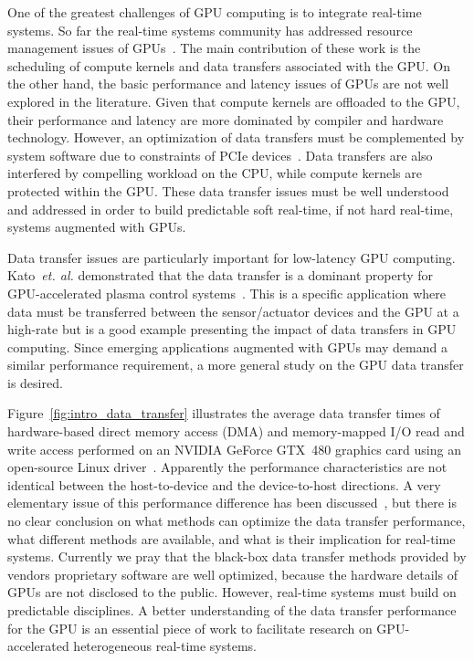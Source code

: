 One of the greatest challenges of GPU computing is to integrate
real-time systems.
So far the real-time systems community has addressed resource management
issues of GPUs~\cite{Basaran_ECRTS12, Elliott_RTS12, Elliott_ECRTS12,
Kato_ATC11, Kato_RTAS11, Kato_RTSS11}.
The main contribution of these work is the scheduling of compute
kernels and data transfers associated with the GPU.
On the other hand, the basic performance and latency issues of GPUs are
not well explored in the literature.
Given that compute kernels are offloaded to the GPU, their performance
and latency are more dominated by compiler and hardware technology.
However, an optimization of data transfers must be complemented by system
software due to constraints of PCIe devices~\cite{Kato_ATC12}.
Data transfers are also interfered by compelling workload on the CPU,
while compute kernels are protected within the GPU.
These data transfer issues must be well understood and addressed in
order to build predictable soft real-time, if not hard real-time,
systems augmented with GPUs.

Data transfer issues are particularly important for low-latency GPU
computing.
Kato~\textit{et. al.} demonstrated that the data transfer is a dominant
property for GPU-accelerated plasma control systems~\cite{Kato_ICCPS13}.
This is a specific application where data must be transferred between the
sensor/actuator devices and the GPU at a high-rate but is a good example
presenting the impact of data transfers in GPU computing.
Since emerging applications augmented with GPUs may demand a similar
performance requirement, a more general study on the GPU data transfer
is desired.

Figure~\ref{fig:intro_data_transfer} illustrates the average data
transfer times of hardware-based direct memory access (DMA) and
memory-mapped I/O read and write access performed on an NVIDIA GeForce
GTX~480 graphics card using an open-source Linux
driver~\cite{Kato_ATC12}.
Apparently the performance characteristics are not identical between the
host-to-device and the device-to-host directions.
A very elementary issue of this performance difference has been
discussed~\cite{Kato_ATC12}, but there is no clear conclusion on what
methods can optimize the data transfer performance, what different
methods are available, and what is their implication for real-time
systems.
Currently we pray that the black-box data transfer methods provided by
vendors proprietary software are well optimized, because the hardware
details of GPUs are not disclosed to the public.
However, real-time systems must build on predictable disciplines.
A better understanding of the data transfer performance for the GPU is
an essential piece of work to facilitate research on GPU-accelerated
heterogeneous real-time systems.

